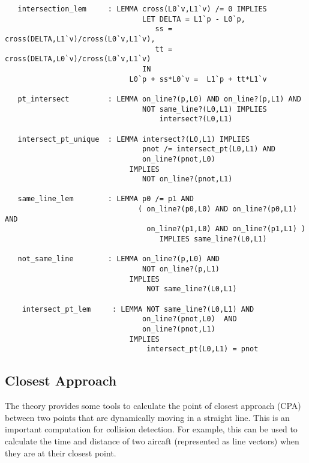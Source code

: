 \documentclass[12pt]{article}
\begin{document}
\begin{verbatim}
   intersection_lem     : LEMMA cross(L0`v,L1`v) /= 0 IMPLIES
                                LET DELTA = L1`p - L0`p,
                                   ss = cross(DELTA,L1`v)/cross(L0`v,L1`v),
                                   tt = cross(DELTA,L0`v)/cross(L0`v,L1`v)
                                IN
                             L0`p + ss*L0`v =  L1`p + tt*L1`v

   pt_intersect         : LEMMA on_line?(p,L0) AND on_line?(p,L1) AND
                                NOT same_line?(L0,L1) IMPLIES
                                    intersect?(L0,L1) 

   intersect_pt_unique  : LEMMA intersect?(L0,L1) IMPLIES
                                pnot /= intersect_pt(L0,L1) AND
                                on_line?(pnot,L0)  
                             IMPLIES
                                NOT on_line?(pnot,L1)

   same_line_lem        : LEMMA p0 /= p1 AND
                               ( on_line?(p0,L0) AND on_line?(p0,L1) AND
                                 on_line?(p1,L0) AND on_line?(p1,L1) )
                                    IMPLIES same_line?(L0,L1)
        
   not_same_line        : LEMMA on_line?(p,L0) AND 
                                NOT on_line?(p,L1) 
                             IMPLIES
                                 NOT same_line?(L0,L1)
                         
    intersect_pt_lem     : LEMMA NOT same_line?(L0,L1) AND
                                on_line?(pnot,L0)  AND
                                on_line?(pnot,L1)  
                             IMPLIES
                                 intersect_pt(L0,L1) = pnot 
\end{verbatim}

\subsection{Closest Approach}

The theory  provides some tools to
calculate the point of closest approach (CPA) between two points that
are dynamically moving in a straight line.  This is an important
computation for collision detection. For example, this can be used to
calculate the time and distance of two aircaft (represented as line
vectors) when they are at their closest point.
\end{document}
